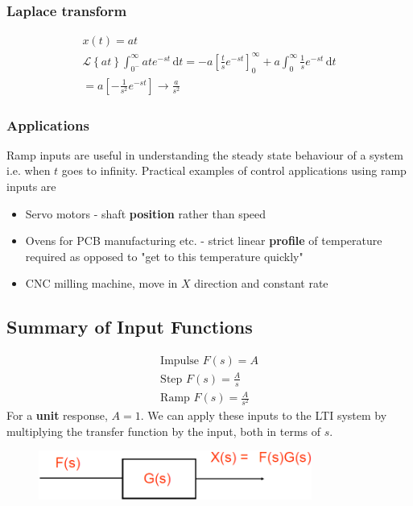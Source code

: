\documentclass[class=report, crop=false, 12pt,a4paper, tikz, border=4mm]{standalone}
\begin{document}
\subsubsection{Laplace transform}
\begin{gather}
  x(t) = at\\
  \mathcal{L} \left\{ at \right\} \int_{0^-}^{\infty} ate^{-st} \,\mathrm{d}t = -a \left[ \frac{t}{s}e^{-st} \right]_{0}^{\infty} + a\int_{0}^{\infty} \frac{1}{s} e^{-st} \,\mathrm{d}t\\
  = a \left[ -\frac{1}{s^2}e^{-st} \right] \rightarrow \frac{a}{s^2}   
\end{gather}
\subsubsection{Applications}
Ramp inputs are useful in understanding the steady state behaviour of a system i.e. when $t$ goes to infinity. Practical examples of control applications using ramp inputs are
\begin{itemize}
  \item Servo motors - shaft \textbf{position} rather than speed
  \item Ovens for PCB manufacturing etc. - strict linear \textbf{profile} of temperature required as opposed to "get to this temperature quickly"
  \item CNC milling machine, move in $X$ direction and constant rate
\end{itemize}
\subsection{Summary of Input Functions}
\begin{gather}
  \textrm{Impulse } F(s) = A\\
  \textrm{Step } F(s) = \frac{A}{s}\\
  \textrm{Ramp } F(s) = \frac{A}{s^2}
\end{gather}
For a \textbf{unit} response, $A=1$. We can apply these inputs to the LTI system by multiplying the transfer function by the input, both in terms of $s$.
\begin{figure}[H]
  \centering
  \includegraphics[width = 0.8\textwidth]{../img/diagram30.png}
\end{figure}
\end{document}
